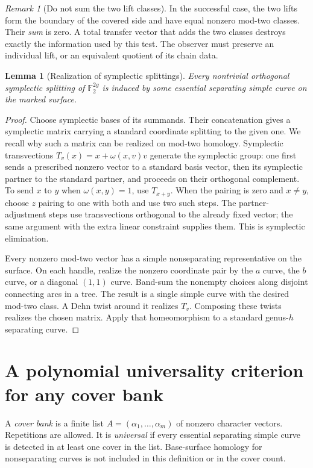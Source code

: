 \documentclass[11pt,letterpaper]{article}
\newtheorem{lemma}[lemma]{Lemma}
\theoremstyle{definition}
\theoremstyle{remark}
\newtheorem{remark}[remark]{Remark}
\newcommand{\F}{\mathbb F_2}
\begin{document}
\begin{remark}[Do not sum the two lift classes]
In the successful case, the two lifts form the boundary of the covered side and have equal nonzero mod-two classes. Their \emph{sum} is zero. A total transfer vector that adds the two classes destroys exactly the information used by this test. The observer must preserve an individual lift, or an equivalent quotient of its chain data.
\end{remark}

\begin{lemma}[Realization of symplectic splittings]\label{lem:realization}
Every nontrivial orthogonal symplectic splitting of $\F^{2g}$ is induced by some essential separating simple curve on the marked surface.
\end{lemma}
\begin{proof}
Choose symplectic bases of its summands. Their concatenation gives a symplectic matrix carrying a standard coordinate splitting to the given one. We recall why such a matrix can be realized on mod-two homology. Symplectic transvections
$T_v(x)=x+\omega(x,v)v$ generate the symplectic group: one first sends a prescribed nonzero vector to a standard basis vector, then its symplectic partner to the standard partner, and proceeds on their orthogonal complement. To send $x$ to $y$ when $\omega(x,y)=1$, use $T_{x+y}$. When the pairing is zero and $x\ne y$, choose $z$ pairing to one with both and use two such steps. The partner-adjustment steps use transvections orthogonal to the already fixed vector; the same argument with the extra linear constraint supplies them. This is symplectic elimination.

Every nonzero mod-two vector has a simple nonseparating representative on the surface. On each handle, realize the nonzero coordinate pair by the $a$ curve, the $b$ curve, or a diagonal $(1,1)$ curve. Band-sum the nonempty choices along disjoint connecting arcs in a tree. The result is a single simple curve with the desired mod-two class. A Dehn twist around it realizes $T_v$. Composing these twists realizes the chosen matrix. Apply that homeomorphism to a standard genus-$h$ separating curve.
\end{proof}

\section{A polynomial universality criterion for any cover bank}
\label{sec:bank}
A \emph{cover bank} is a finite list $A=(\alpha_1,\ldots,\alpha_m)$ of nonzero character vectors. Repetitions are allowed. It is \emph{universal} if every essential separating simple curve is detected in at least one cover in the list. Base-surface homology for nonseparating curves is not included in this definition or in the cover count.
\end{document}
